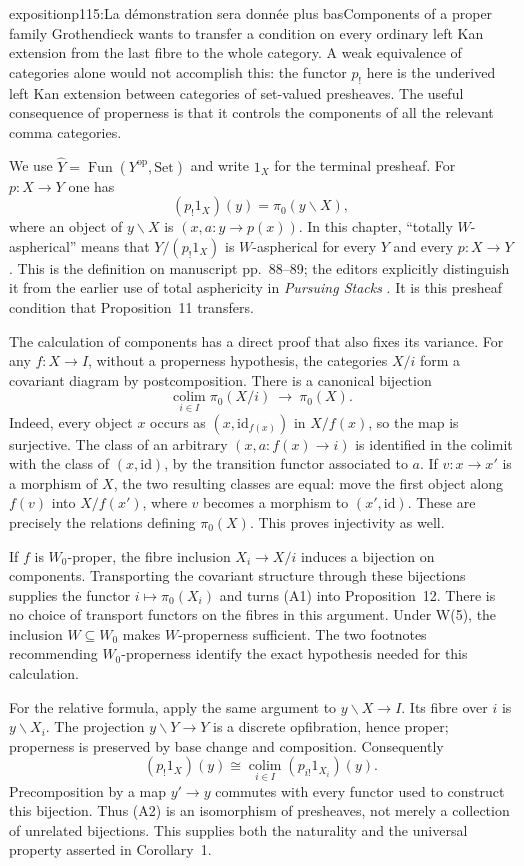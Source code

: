\begin{dcomment}{exposition}{p115:La démonstration sera donnée plus bas}{Components of a proper family}
Grothendieck wants to transfer a condition on every ordinary left Kan extension from the last fibre to the whole category.  A weak equivalence of categories alone would not accomplish this: the functor $p_!$ here is the underived left Kan extension between categories of set-valued presheaves.  The useful consequence of properness is that it controls the components of all the relevant comma categories.

We use $\widehat Y=\operatorname{Fun}(Y^{\mathrm{op}},\mathrm{Set})$ and write $1_X$ for the terminal presheaf.  For $p:X\to Y$ one has
\[
 (p_!1_X)(y)=\pi_0(y\backslash X),
\]
where an object of $y\backslash X$ is $(x,a:y\to p(x))$.  In this chapter, ``totally $W$-aspherical'' means that $Y/(p_!1_X)$ is $W$-aspherical for every $Y$ and every $p:X\to Y$.  This is the definition on manuscript pp.~88--89; the editors explicitly distinguish it from the earlier use of total asphericity in \emph{Pursuing Stacks} \citep[Definition~1]{Grothendieck1990XII}.  It is this presheaf condition that Proposition~11 transfers.

The calculation of components has a direct proof that also fixes its variance.  For any $f:X\to I$, without a properness hypothesis, the categories $X/i$ form a covariant diagram by postcomposition.  There is a canonical bijection
\[
 \operatorname*{colim}_{i\in I}\pi_0(X/i)\ \longrightarrow\ \pi_0(X).
 \tag{A1}
\]
Indeed, every object $x$ occurs as $(x,\mathrm{id}_{f(x)})$ in $X/f(x)$, so the map is surjective.  The class of an arbitrary $(x,a:f(x)\to i)$ is identified in the colimit with the class of $(x,\mathrm{id})$, by the transition functor associated to $a$.  If $v:x\to x'$ is a morphism of $X$, the two resulting classes are equal: move the first object along $f(v)$ into $X/f(x')$, where $v$ becomes a morphism to $(x',\mathrm{id})$.  These are precisely the relations defining $\pi_0(X)$.  This proves injectivity as well.

If $f$ is $W_0$-proper, the fibre inclusion $X_i\to X/i$ induces a bijection on components.  Transporting the covariant structure through these bijections supplies the functor $i\mapsto\pi_0(X_i)$ and turns (A1) into Proposition~12.  There is no choice of transport functors on the fibres in this argument.  Under W(5), the inclusion $W\subseteq W_0$ makes $W$-properness sufficient.  The two footnotes recommending $W_0$-properness identify the exact hypothesis needed for this calculation.

For the relative formula, apply the same argument to $y\backslash X\to I$.  Its fibre over $i$ is $y\backslash X_i$.  The projection $y\backslash Y\to Y$ is a discrete opfibration, hence proper; properness is preserved by base change and composition.  Consequently
\[
 (p_!1_X)(y)\cong
 \operatorname*{colim}_{i\in I}(p_{i!}1_{X_i})(y).
 \tag{A2}
\]
Precomposition by a map $y'\to y$ commutes with every functor used to construct this bijection.  Thus (A2) is an isomorphism of presheaves, not merely a collection of unrelated bijections.  This supplies both the naturality and the universal property asserted in Corollary~1.
\end{dcomment}

